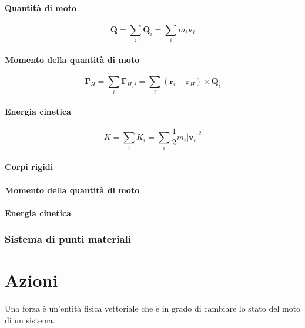 \subsubsection{Quantità di moto}
\begin{equation}
    \mathbf{Q} = \sum_{i} \mathbf{Q}_i = \sum_i m_i \mathbf{v}_i
\end{equation}
\subsubsection{Momento della quantità di moto}
\begin{equation}
    \mathbf{\Gamma}_H = \sum_{i} \mathbf{\Gamma}_{H,i} = \sum_i \left( \mathbf{r}_i - \mathbf{r}_H \right) \times \mathbf{Q}_i
\end{equation}
\subsubsection{Energia cinetica}
\begin{equation}
    K = \sum_i K_i = \sum_i \dfrac{1}{2} m_i | \mathbf{v}_i |^2
\end{equation}

\subsubsection{Corpi rigidi}
\subsubsection{Momento della quantità di moto}
\subsubsection{Energia cinetica}

\subsection{Sistema di punti materiali}

\chapter{Azioni}
\begin{definition}[Forza] Una forza è un'entità fisica vettoriale che è in grado di cambiare lo stato del moto di un sistema.
\end{definition}

